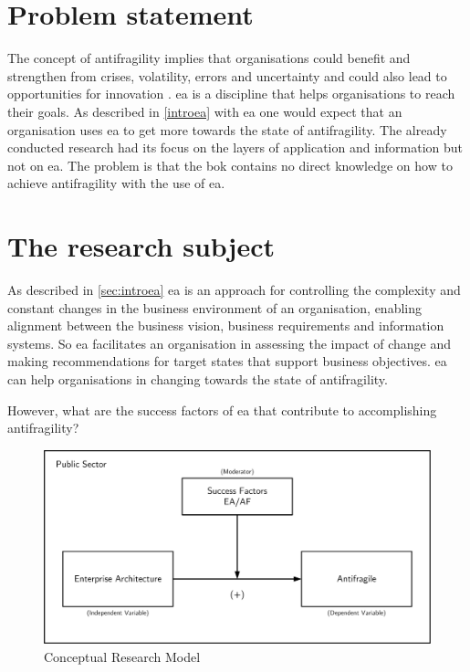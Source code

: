 \section{Problem statement}
\label{sec:problemstatement}
The concept of \gls{antifragility} implies that organisations could benefit and strengthen from crises, volatility, errors and uncertainty and could also lead to opportunities for innovation \parencite{Kastner2017}. \acrshort{ea} is a discipline that helps organisations to reach their goals. As described in \cref{introea} with \acrshort{ea} one would expect that an organisation uses \acrshort{ea} to get more towards the state of \gls{antifragility}. The already conducted research had its focus on the layers of application and information but not on \acrshort{ea}. The problem is that the \acrlong{bok} contains no direct knowledge on how to achieve \gls{antifragility} with the use of \acrshort{ea}. 

\section{The research subject}
\label{sec:researchsubject}
As described in \cref{sec:introea} \acrshort{ea} is an approach for controlling the complexity and constant changes in the business environment of an organisation, enabling alignment between the business vision, business requirements and information systems. So \acrshort{ea} facilitates an organisation in assessing the impact of change and making recommendations for target states that support business objectives. \acrshort{ea} can help organisations in changing towards the state of \gls{antifragility}.

However, what are the success factors of \acrshort{ea} that contribute to accomplishing \gls{antifragility}? 
\begin{figure}[H]
	\centering
	\includegraphics[width=0.8\linewidth]{images/conceptualmodel}
	\caption[Conceptual Research Model]{Conceptual Research Model}
	\label{fig:conceptualmodel}
\end{figure}

